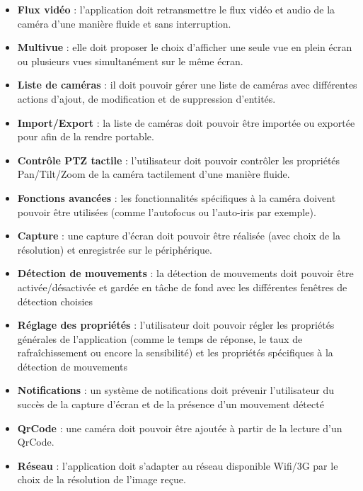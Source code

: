 \begin{itemize}
  \item {\bf Flux vidéo} : l'application doit retransmettre le flux vidéo et
  audio de la caméra d'une manière fluide et sans interruption.
  \item {\bf Multivue} : elle doit proposer le choix d'afficher une seule vue en
  plein écran ou plusieurs vues simultanément sur le même écran.
  \item {\bf Liste de caméras} : il doit pouvoir gérer une liste de caméras avec
  différentes actions d'ajout, de modification et de suppression d'entités.
  \item {\bf Import/Export} : la liste de caméras doit pouvoir être importée ou
  exportée pour afin de la rendre portable.
  \item {\bf Contrôle PTZ tactile} : l'utilisateur doit pouvoir contrôler les
  propriétés Pan/Tilt/Zoom de la caméra tactilement d'une manière fluide.
  \item {\bf Fonctions avancées} : les fonctionnalités spécifiques à la caméra
  doivent pouvoir être utilisées (comme l'autofocus ou l'auto-iris par exemple).
  \item {\bf Capture} : une capture d'écran doit pouvoir être réalisée (avec
  choix de la résolution) et enregistrée sur le périphérique.
  \item {\bf Détection de mouvements} : la détection de mouvements doit pouvoir
  être activée/désactivée et gardée en tâche de fond avec les différentes fenêtres de détection choisies
  \item {\bf Réglage des propriétés} : l'utilisateur doit pouvoir régler les
  propriétés générales de l'application (comme le temps de réponse, le taux de rafraîchissement ou encore la sensibilité) et les propriétés spécifiques à la détection de mouvements
  \item {\bf Notifications} : un système de notifications doit prévenir
  l'utilisateur du succès de la capture d'écran et de la présence d'un mouvement détecté
  \item {\bf QrCode} : une caméra doit pouvoir être ajoutée à partir de la
  lecture d'un QrCode.
  \item {\bf Réseau} : l'application doit s'adapter au réseau disponible Wifi/3G
  par le choix de la résolution de l'image reçue.
\end{itemize}

